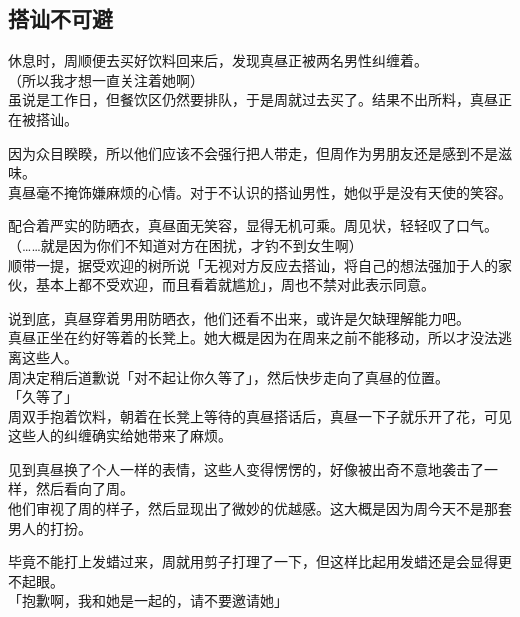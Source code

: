 \subsection{搭讪不可避}

休息时，周顺便去买好饮料回来后，发现真昼正被两名男性纠缠着。\\

（所以我才想一直关注着她啊）\\

虽说是工作日，但餐饮区仍然要排队，于是周就过去买了。结果不出所料，真昼正在被搭讪。

因为众目睽睽，所以他们应该不会强行把人带走，但周作为男朋友还是感到不是滋味。\\

真昼毫不掩饰嫌麻烦的心情。对于不认识的搭讪男性，她似乎是没有天使的笑容。

配合着严实的防晒衣，真昼面无笑容，显得无机可乘。周见状，轻轻叹了口气。\\

（……就是因为你们不知道对方在困扰，才钓不到女生啊）\\

顺带一提，据受欢迎的树所说「无视对方反应去搭讪，将自己的想法强加于人的家伙，基本上都不受欢迎，而且看着就尴尬」，周也不禁对此表示同意。

说到底，真昼穿着男用防晒衣，他们还看不出来，或许是欠缺理解能力吧。\\

真昼正坐在约好等着的长凳上。她大概是因为在周来之前不能移动，所以才没法逃离这些人。\\

周决定稍后道歉说「对不起让你久等了」，然后快步走向了真昼的位置。\\

「久等了」\\

周双手抱着饮料，朝着在长凳上等待的真昼搭话后，真昼一下子就乐开了花，可见这些人的纠缠确实给她带来了麻烦。

见到真昼换了个人一样的表情，这些人变得愣愣的，好像被出奇不意地袭击了一样，然后看向了周。\\

他们审视了周的样子，然后显现出了微妙的优越感。这大概是因为周今天不是那套男人的打扮。

毕竟不能打上发蜡过来，周就用剪子打理了一下，但这样比起用发蜡还是会显得更不起眼。\\

「抱歉啊，我和她是一起的，请不要邀请她」\\

